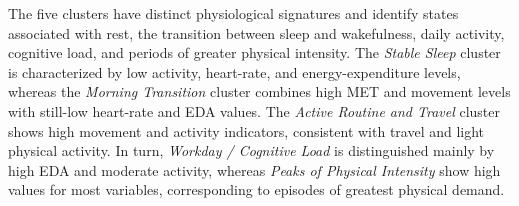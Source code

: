 \documentclass[a4paper,fleqn]{cas-sc}
\begin{document}
\begin{center}
    \label{tab:percentis_gmm_janela}
    \renewcommand{\arraystretch}{1.4}
\end{center}

The five clusters have distinct physiological signatures and identify states associated with rest, the transition between sleep and wakefulness, daily activity, cognitive load, and periods of greater physical intensity. The \textit{Stable Sleep} cluster is characterized by low activity, heart-rate, and energy-expenditure levels, whereas the \textit{Morning Transition} cluster combines high MET and movement levels with still-low heart-rate and EDA values. The \textit{Active Routine and Travel} cluster shows high movement and activity indicators, consistent with travel and light physical activity. In turn, \textit{Workday / Cognitive Load} is distinguished mainly by high EDA and moderate activity, whereas \textit{Peaks of Physical Intensity} show high values for most variables, corresponding to episodes of greatest physical demand.
\end{document}
